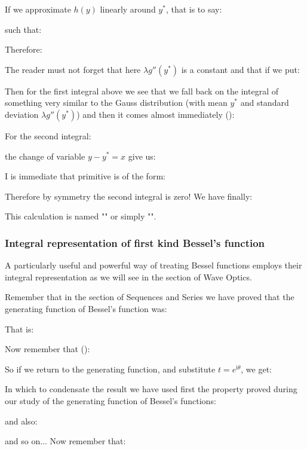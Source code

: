 \begin{enumerate}
		If we approximate $h(y)$ linearly around $y^*$, that is to say:
		
		such that:
		
		Therefore:
		
		The reader must not forget that here $\lambda g''(y^*)$ is a constant and that if we put:
		
		Then for the first integral above we see that we fall back on the integral of something very similar to the Gauss distribution (with mean $y^*$ and standard deviation $\lambda g''(y^*)$) and then it comes almost immediately ():
		
		For the second integral:
		
		the change of variable $y-y^*=x$ give us:
		
		I is immediate that primitive is of the form:
		
		Therefore by symmetry the second integral is zero! We have finally:
		
		This calculation is named "\label{laplace method of integration}" or simply "".
	\end{enumerate}
	
	\subsubsection{Integral representation of first kind Bessel's function}\label{integral representation of first kind Bessel's function}
	A particularly useful and powerful way of treating Bessel functions employs their integral representation as we will see in the section of Wave Optics.
	
	Remember that in the section of Sequences and Series we have proved that the generating function of Bessel's function was:
	
	That is:
	
	Now remember that ():
	
	So if we return to the generating function, and substitute $t=e^{\mathrm{i}\theta}$, we get:
	
	In which to condensate the result we have used first the property proved during our study of the generating function of Bessel's functions:
	
	and also:
	
	and so on...
	Now remember that:
	
